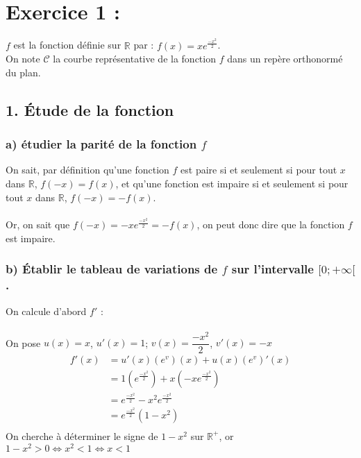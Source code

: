 \documentclass[]{article}
\date{}
\begin{document}
\hypertarget{header-n8510}{%
\section{Exercice 1 :}\label{header-n8510}}

\(f\) est la fonction définie sur \(\mathbb{R}\) par :
\(f(x) = xe^{\frac{-x^2}{2}}\).\\
On note \(\mathscr{C}\) la courbe représentative de la fonction \(f\)
dans un repère orthonormé du plan.

\hypertarget{header-n8512}{%
\subsection{1. Étude de la fonction}\label{header-n8512}}

\hypertarget{header-n8513}{%
\subsubsection{\texorpdfstring{a) étudier la parité de la fonction
\(f\)}{a) étudier la parité de la fonction f}}\label{header-n8513}}

On sait, par définition qu'une fonction \(f\) est paire si et seulement
si pour tout \(x\) dans \(\mathbb{R}\), \(f(-x) = f(x)\), et qu'une
fonction est impaire si et seulement si pour tout \(x\) dans
\(\mathbb{R}\), \(f(-x) = -f(x)\).\\
 ~\\
Or, on sait que \(f(-x) = -xe^{\frac{-x^2}{2}} = -f(x)\), on peut donc
dire que la fonction \(f\) est impaire.\\

\hypertarget{header-n8515}{%
\subsubsection{\texorpdfstring{b) Établir le tableau de variations de
\(f\) sur l'intervalle
\([0; +\infty[\).}{b) Établir le tableau de variations de f sur l'intervalle {[}0; +\textbackslash{}infty{[}.}}\label{header-n8515}}

On calcule d'abord \(f'\) :\\
 ~\\
On pose \(u(x) = x\), \(u'(x) = 1\); \(v(x) = \dfrac{-x^2}{2}\),
\(v'(x) = -x\)\\
\[
\begin{array}{rl}
        f'(x) &= u'(x)\left(e^v\right)(x) + u(x)\left(e^v\right)'(x)\\
              &= 1\left(e^{\frac{-x^2}{2}}\right) + x\left(-xe^{\frac{-x^2}{2}}\right)\\
              &= e^{\frac{-x^2}{2}} - x^2e^{\frac{-x^2}{2}}\\
              &= e^{\frac{-x^2}{2}}\left(1-x^2\right)\\
    \end{array}
\]
On cherche à déterminer le signe de \(1-x^2\) sur \(\mathbb{R}^+\), or
\(1-x^2>0 \iff x^2 < 1 \iff x < 1\)
\end{document}
